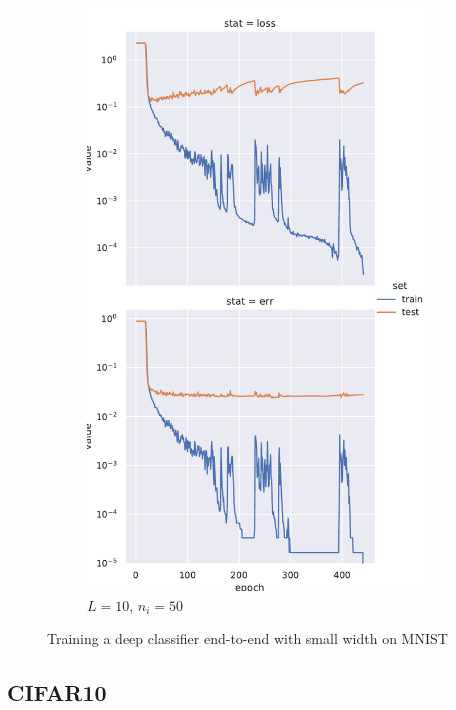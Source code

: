\documentclass[a4paper]{article}
\begin{document}
\begin{figure}[!ht]
\begin{subfigure}{0.24\textwidth}
    \includegraphics[width=\textwidth]{mnist/L_10_w_50}
\caption{$L = 10$, $n_i = 50$}
\end{subfigure}
\caption{Training a deep classifier end-to-end with small width on MNIST}
    \label{fig:mnist-small-width}
\end{figure}


\pagebreak

\subsection{CIFAR10}
\end{document}
